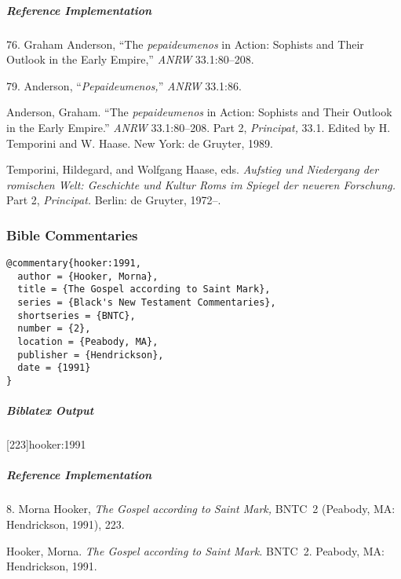 \documentclass[a4paper]{article}
\newenvironment{biboutput}{%
  \subparagraph{Biblatex Output}
}{\color{black}}
\newenvironment{refimp}{%
  \subparagraph{Reference Implementation}
  \color{reference-colour}
  \rm
}{\par\color{black}}
\begin{document}
\begin{refimp}
  \hspace*{\bibindent}76. Graham Anderson, “The \emph{pepaideumenos} in
  Action: Sophists and Their Outlook in the Early Empire,” \emph{ANRW}
  33.1:80–208.

  \hspace*{\bibindent}79. Anderson, “\emph{Pepaideumenos,}” \emph{ANRW}
  33.1:86.

  \hangindent\bibindent Anderson, Graham. “The \emph{pepaideumenos} in Action:
  Sophists and Their Outlook in the Early Empire.” \emph{ANRW} 33.1:80–208.
  Part 2, \emph{Principat,} 33.1. Edited by H. Temporini and W. Haase. New
  York: de Gruyter, 1989.

  \hangindent\bibindent Temporini, Hildegard, and Wolfgang Haase, eds.
  \emph{Aufstieg und Niedergang der romischen Welt: Geschichte und Kultur Roms
  im Spiegel der neueren Forschung.} Part 2, \emph{Principat.} Berlin: de
  Gruyter, 1972–.

\end{refimp}

\subsubsection{Bible Commentaries}

\begin{lstlisting}
@commentary{hooker:1991,
  author = {Hooker, Morna},
  title = {The Gospel according to Saint Mark},
  series = {Black's New Testament Commentaries},
  shortseries = {BNTC},
  number = {2},
  location = {Peabody, MA},
  publisher = {Hendrickson},
  date = {1991}
}
\end{lstlisting}  

\begin{biboutput}
  [223]{hooker:1991}
\end{biboutput}

\begin{refimp}
  \hspace*{\bibindent}8. Morna Hooker, \emph{The Gospel according to Saint
  Mark,} BNTC~2 (Peabody, MA: Hendrickson, 1991), 223.

  \hangindent\bibindent Hooker, Morna. \emph{The Gospel according to Saint
  Mark.} BNTC~2. Peabody, MA: Hendrickson, 1991.

\end{refimp}
\end{document}
